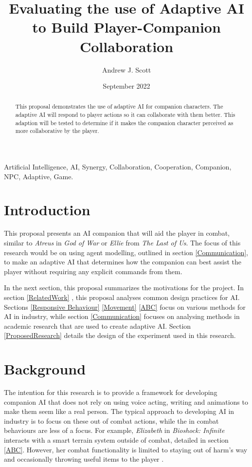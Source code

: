 \documentclass{IEEEtran}
\title{Evaluating the use of Adaptive AI to Build Player-Companion Collaboration}
\author{Andrew J. Scott}
\date{September 2022}
\begin{document}
	\maketitle


\begin{abstract}
This proposal demonstrates the use of adaptive AI for companion characters. The adaptive AI will respond to player actions so it can collaborate with them better. This adaption will be tested to determine if it makes the companion character perceived as more collaborative by the player.
\end{abstract}

 \begin{IEEEkeywords}
Artificial Intelligence, AI, Synergy, Collaboration, Cooperation, Companion, NPC, Adaptive, Game.
\end{IEEEkeywords}

\section{Introduction}
\label{Intro}

This proposal presents an AI companion that will aid the player in combat, similar to \textit{Atreus} in \textit{God of War} or \textit{Ellie} from \textit{The Last of Us}. The focus of this research would be on using agent modelling, outlined in section \ref{Communication}, to make an adaptive AI that determines how the companion can best assist the player without requiring any explicit commands from them.

In the next section, this proposal summarizes the motivations for the project. In section \ref{RelatedWork} , this proposal analyses common design practices for AI. Sections \ref{Responsive Behaviour} \ref{Movement} \ref{ABC} focus on various methods for AI in industry, while section \ref{Communication} focuses on analysing methods in academic research that are used to create adaptive AI. Section \ref{ProposedResearch} details the design of the experiment used in this research.

\section{Background}
\label{Background}

The intention for this research is to provide a framework for developing companion AI that does not rely on using voice acting, writing and animations to make them seem like a real person. The typical approach to developing AI in industry is to focus on these out of combat actions, while the in combat behaviours are less of a focus. For example, \textit{Elizabeth} in \textit{Bioshock: Infinite} interacts with a smart terrain system outside of combat, detailed in section \ref{ABC}. However, her combat functionality is limited to staying out of harm's way and occasionally throwing useful items to the player \cite{GDCElizabeth}.
\end{document}

